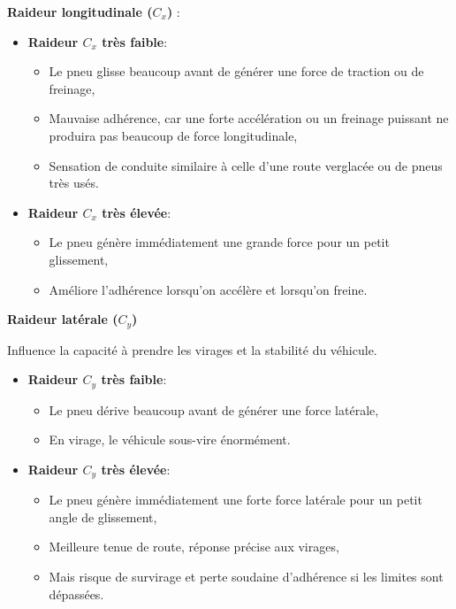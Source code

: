 \textbf{Raideur longitudinale ($C_x$) }:
\begin{itemize}
    \item \textbf{Raideur $C_x$ très faible}:
    \begin{itemize}
        \item Le pneu glisse beaucoup avant de générer une force de traction ou de freinage,
        \item Mauvaise adhérence, car une forte accélération ou un freinage puissant ne produira pas beaucoup de force longitudinale,
        \item Sensation de conduite similaire à celle d’une route verglacée ou de pneus très usés.
    \end{itemize}

    \item \textbf{Raideur $C_x$ très élevée}:
    \begin{itemize}
        \item Le pneu génère immédiatement une grande force pour un petit glissement,
        \item Améliore l’adhérence lorsqu'on accélère et lorsqu'on freine.
    \end{itemize}
\end{itemize}

\textbf{Raideur latérale ($C_y$)}

Influence la capacité à prendre les virages et la stabilité du véhicule.

\begin{itemize}
    \item \textbf{Raideur $C_y$ très faible}:
    \begin{itemize}
        \item Le pneu dérive beaucoup avant de générer une force latérale,
        \item En virage, le véhicule sous-vire énormément.
    \end{itemize}

    \item \textbf{Raideur $C_y$ très élevée}:
    \begin{itemize}
        \item Le pneu génère immédiatement une forte force latérale pour un petit angle de glissement,
        \item Meilleure tenue de route, réponse précise aux virages,
        \item Mais risque de survirage et perte soudaine d’adhérence si les limites sont dépassées.
    \end{itemize}
\end{itemize}

